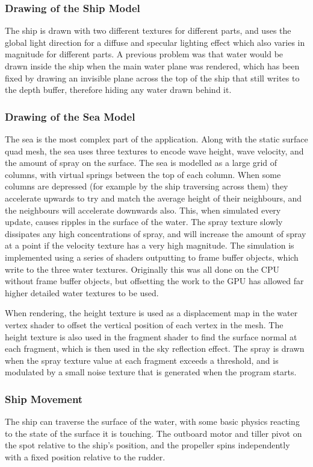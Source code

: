 \documentclass[a4paper,11pt]{article}
\begin{document}
\subsubsection{Drawing of the Ship Model}
The ship is drawn with two different textures for different parts, and uses the global light direction for a diffuse and specular lighting effect which also varies in magnitude for different parts. A previous problem was that water would be drawn inside the ship when the main water plane was rendered, which has been fixed by drawing an invisible plane across the top of the ship that still writes to the depth buffer, therefore hiding any water drawn behind it.

\subsubsection{Drawing of the Sea Model}
The sea is the most complex part of the application. Along with the static surface quad mesh, the sea uses three textures to encode wave height, wave velocity, and the amount of spray on the surface. The sea is modelled as a large grid of columns, with virtual springs between the top of each column. When some columns are depressed (for example by the ship traversing across them) they accelerate upwards to try and match the average height of their neighbours, and the neighbours will accelerate downwards also. This, when simulated every update, causes ripples in the surface of the water. The spray texture slowly dissipates any high concentrations of spray, and will increase the amount of spray at a point if the velocity texture has a very high magnitude. The simulation is implemented using a series of shaders outputting to frame buffer objects, which write to the three water textures. Originally this was all done on the CPU without frame buffer objects, but offsetting the work to the GPU has allowed far higher detailed water textures to be used.

When rendering, the height texture is used as a displacement map in the water vertex shader to offset the vertical position of each vertex in the mesh. The height texture is also used in the fragment shader to find the surface normal at each fragment, which is then used in the sky reflection effect. The spray is drawn when the spray texture value at each fragment exceeds a threshold, and is modulated by a small noise texture that is generated when the program starts.

\subsubsection{Ship Movement}
The ship can traverse the surface of the water, with some basic physics reacting to the state of the surface it is touching. The outboard motor and tiller pivot on the spot relative to the ship's position, and the propeller spins independently with a fixed position relative to the rudder.
\end{document}
